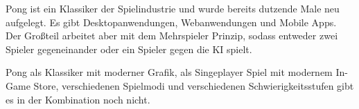 Pong ist ein Klassiker der Spielindustrie und wurde bereits dutzende Male neu aufgelegt.
Es gibt Desktopanwendungen, Webanwendungen und Mobile Apps. Der Großteil arbeitet aber mit dem Mehrspieler Prinzip, sodass entweder zwei Spieler gegeneinander oder ein Spieler gegen die KI spielt.

Pong als Klassiker mit moderner Grafik, als Singeplayer Spiel mit modernem In-Game Store, verschiedenen Spielmodi und verschiedenen Schwierigkeitsstufen gibt es in der Kombination noch nicht. 